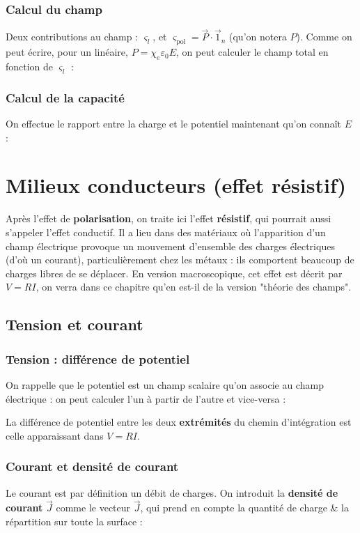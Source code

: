 \documentclass[12pt]{book}
\begin{document}
\subsection{Calcul du champ}
Deux contributions au champ : $\varsigma_l$, et $\varsigma_{\text{pol}} = \vec{P}\cdot \vec{1}_n$ (qu'on notera $P$). Comme on peut écrire, pour un linéaire, $P = \chi_e \varepsilon_0E$, on peut calculer le champ total en fonction de $\varsigma_l$ :

\subsection{Calcul de la capacité}
On effectue le rapport entre la charge et le potentiel maintenant qu'on connaît $E$ : 


\chapter{Milieux conducteurs (effet résistif)}
Après l'effet de \textbf{polarisation}, on traite ici l'effet \textbf{résistif}, qui pourrait aussi s'appeler l'effet conductif. Il a lieu dans des matériaux où l'apparition d'un champ électrique provoque un mouvement d'ensemble des charges électriques (d'où un courant), particulièrement chez les métaux : ils comportent beaucoup de charges libres de se déplacer. En version macroscopique, cet effet est décrit par $V = RI$, on verra dans ce chapitre qu'en est-il de la version "théorie des champs".
\section{Tension et courant}
\subsection{Tension : différence de potentiel}
On rappelle que le potentiel est un champ scalaire qu'on associe au champ électrique : on peut calculer l'un à partir de l'autre et vice-versa :

La différence de potentiel entre les deux \textbf{extrémités} du chemin d'intégration est celle apparaissant dans $V=RI$.
\subsection{Courant et densité de courant}
Le courant est par définition un débit de charges. On introduit la \textbf{densité de courant} $\vec{J}$ comme le vecteur $\vec{J}$, qui prend en compte la quantité de charge \& la répartition sur toute la surface :
\end{document}
